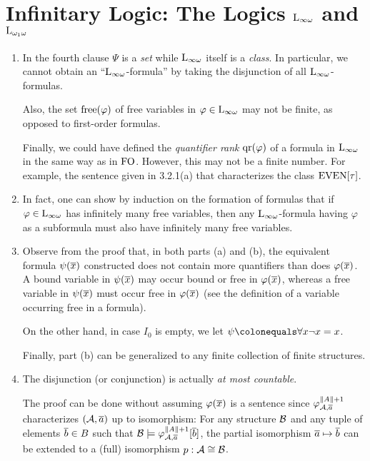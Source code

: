 \section{Infinitary Logic: The Logics $\inflog$ and $\dlog{\omega_1}$}
\begin{enumerate}[1.]
%
\item {} In the fourth clause $\Psi$ is a \emph{set} while $\inflog$ itself is a \emph{class}. In particular, we cannot obtain an ``$\inflog$-formula'' by taking the disjunction of all $\inflog$-formulas.

Also, the set $\mathrm{free}(\varphi)$ of free variables in $\varphi \in \inflog$ may not be finite, as opposed to first-order formulas.

Finally, we could have defined the \emph{quantifier rank} $\mathrm{qr}(\varphi)$ of a formula in $\inflog$ in the same way as in $\folog$. However, this may not be a finite number. For example, the sentence given in 3.2.1(a) that characterizes the class $\mathrm{EVEN}{[\tau]}$.
%
\item {} In fact, one can show by induction on the formation of formulas that if $\varphi \in \inflog$ has infinitely many free variables, then any $\inflog$-formula having $\varphi$ as a subformula must also have infinitely many free variables.
%
\item {} Observe from the proof that, in both parts (a) and (b), the equivalent formula $\psi(\overline{x})$ constructed does not contain more quantifiers than does $\varphi(\overline{x})$. A bound variable in $\psi(\overline{x})$ may occur bound or free in $\varphi(\overline{x})$, whereas a free variable in $\psi(\overline{x})$ must occur free in $\varphi(\overline{x})$ (see the definition of a variable occurring free in a formula).

On the other hand, in case $I_0$ is empty, we let $\psi \defas \forall x \neg x = x$.

Finally, part (b) can be generalized to any finite collection of finite structures.
%
\item {} The disjunction (or conjunction) is actually \emph{at most countable}.

The proof can be done without assuming $\varphi(\overline{x})$ is a sentence since $\varphi^{\|A\| + 1}_{\mathcal{A}, \overline{a}}$ characterizes $(\mathcal{A}, \overline{a})$ up to isomorphism: For any structure $\mathcal{B}$ and any tuple of elements $\overline{b} \in B$ such that $\mathcal{B} \models \varphi^{\|A\| + 1}_{\mathcal{A}, \overline{a}}[\overline{b}]$, the partial isomorphism $\overline{a} \mapsto \overline{b}$ can be extended to a (full) isomorphism $p: \mathcal{A} \cong \mathcal{B}$.


\end{enumerate}

